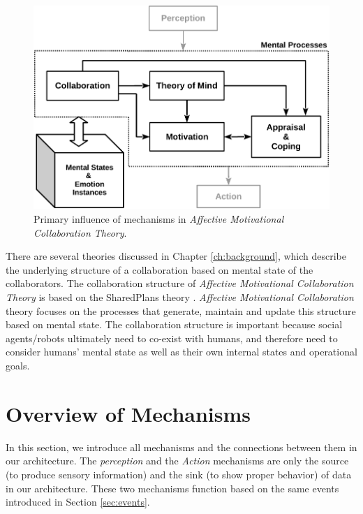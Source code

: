 \documentclass[12pt]{report}
\begin{document}
\begin{figure}[h!] 
  \centering
  \includegraphics[scale=1]{figure/theory-general-croped.pdf}
  \caption{Primary influence of mechanisms in \textit{Affective Motivational
  Collaboration Theory}.}
  \label{fig:theory}
  \vspace*{-2mm}
\end{figure}

There are several theories discussed in Chapter \ref{ch:background}, which
describe the underlying structure of a collaboration based on mental state of
the collaborators. The collaboration structure of \textit{Affective Motivational
Collaboration Theory} is based on the SharedPlans theory
\cite{grosz:shared-plans}. \textit{Affective Motivational Collaboration} theory
focuses on the processes that generate, maintain and update this structure
based on mental state. The collaboration structure is important because social
agents/robots ultimately need to co-exist with humans, and therefore need to
consider humans' mental state as well as their own internal states and
operational goals.

\section{Overview of Mechanisms}

{\color{red}In this section, we introduce all mechanisms and the connections
between them in our architecture. The \textit{perception} and the
\textit{Action} mechanisms are only the source (to produce sensory information)
and the sink (to show proper behavior) of data in our architecture. These two
mechanisms function based on the same events introduced in Section
\ref{sec:events}.}
\end{document}
